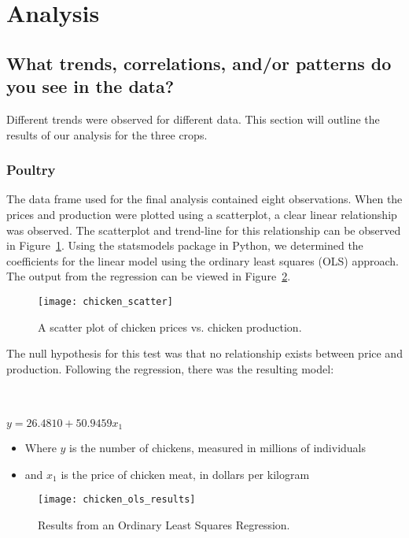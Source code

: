 \section{Analysis}

\subsection{What trends, correlations, and/or patterns do you see in the data?}

Different trends were observed for different data. This section will outline the results of our analysis for the three crops.

\subsubsection{Poultry}

The data frame used for the final analysis contained eight observations.
When the prices and production were plotted using a scatterplot, a clear linear relationship was observed.
The scatterplot and trend-line for this relationship can be observed in Figure~\ref{fig:chicken_scatter}.
Using the statsmodels package in Python, we determined the coefficients for the linear model using the ordinary least squares (OLS) approach.
The output from the regression can be viewed in Figure~\ref{fig:chicken_ols}.

\begin{figure}
    \texttt{[image: chicken\_scatter]}
    \caption{A scatter plot of chicken prices vs. chicken production.}
    \label{fig:chicken_scatter}
\end{figure}

The null hypothesis for this test was that no relationship exists between price and production.
Following the regression, there was the resulting model:

\\~\\

\tabto{5cm} $y = 26.4810 + 50.9459x_1$


\begin{itemize}
    \item Where $y$ is the number of chickens, measured in millions of individuals
    \item and $x_1$ is the price of chicken meat, in dollars per kilogram
\end{itemize}

\begin{figure}
    \texttt{[image: chicken\_ols\_results]}
    \caption{Results from an Ordinary Least Squares Regression.}
    \label{fig:chicken_ols}
\end{figure}

